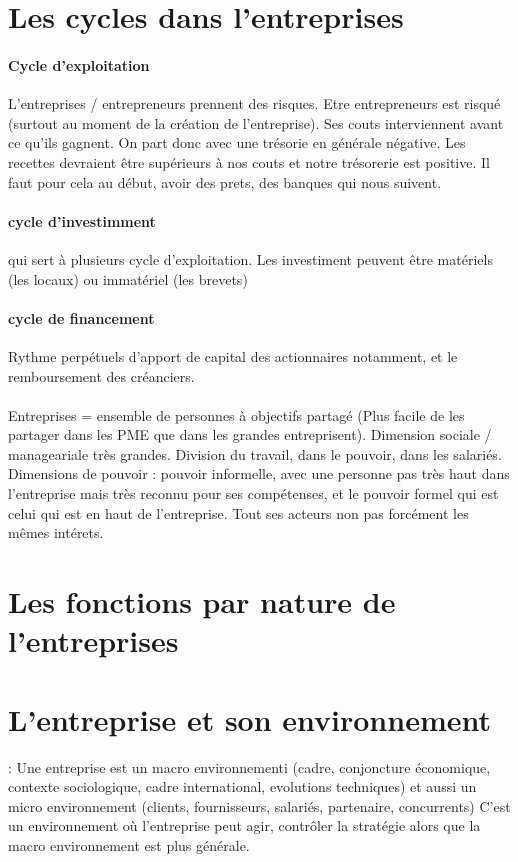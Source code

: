 \section{Les cycles dans l'entreprises}
\paragraph{Cycle d'exploitation} L'entreprises / entrepreneurs prennent des risques. Etre entrepreneurs est risqué (surtout au moment de la création de l'entreprise). Ses couts interviennent avant ce qu'ils gagnent. On part donc avec une trésorie en générale négative. Les recettes devraient être supérieurs à nos couts et notre trésorerie est positive. Il faut pour cela au début, avoir des prets, des banques qui nous suivent.
\paragraph{cycle d'investimment} qui sert à plusieurs cycle d'exploitation. Les investiment peuvent être matériels (les locaux) ou immatériel (les brevets)
\paragraph{cycle de financement} Rythme perpétuels d'apport de capital des actionnaires notamment, et le remboursement des créanciers.
\paragraph{} Entreprises = ensemble de personnes à objectifs partagé (Plus facile de les partager dans les PME que dans les grandes entreprisent). Dimension sociale / manageariale très grandes. Division du travail, dans le pouvoir, dans les salariés. Dimensions de pouvoir : pouvoir informelle, avec une personne pas très haut dans l'entreprise mais très reconnu pour ses compétenses, et le pouvoir formel qui est celui qui est en haut de l'entreprise. Tout ses acteurs non pas forcément les mêmes intérets.

\section{Les fonctions par nature de l'entreprises}

\section{L'entreprise et son environnement} : Une entreprise est un macro environnementi (cadre, conjoncture économique, contexte sociologique, cadre international, evolutions techniques) et aussi un micro environnement (clients, fournisseurs, salariés, partenaire, concurrents) C'est un environnement où l'entreprise peut agir, contrôler la stratégie alors que la macro environnement est plus générale.
